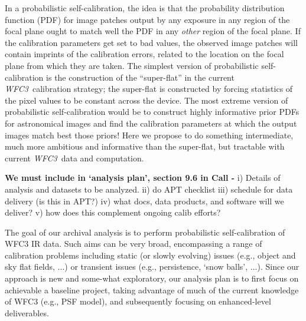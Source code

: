 \documentclass[12pt]{article}
\newcommand{\project}[1]{\textsl{#1}}
\newcommand{\WFC}{\project{WFC3}}
\begin{document}
In a probabilistic self-calibration, the idea is that the probability
distribution function (PDF) for image patches output by any exposure
in any region of the focal plane ought to match well the PDF in any
\emph{other} region of the focal plane.  If the calibration parameters
get set to bad values, the observed image patches will contain
imprints of the calibration errors, related to the location on the
focal plane from which they are taken.  The simplest version of
probabilistic self-calibration is the construction of the
``super-flat'' in the current \WFC\ calibration strategy; the
super-flat is constructed by forcing statistics of the pixel values to
be constant across the device.  The most extreme version of
probabilistic self-calibration would be to construct highly
informative prior PDFs for astronomical images and find the
calibration parameters at which the output images match best those
priors!  Here we propose to do something intermediate, much more
ambitious and informative than the super-flat, but tractable with
current \WFC\ data and computation.

%
%
\describearchival       %


\textbf{We must include in `analysis plan', section 9.6 in Call -} 
i) Details of analysis and datasets to be analyzed.  ii) do APT
checklist iii) schedule for data delivery (is this in APT?) iv) what
docs, data products, and software will we deliver? v) how does this 
complement ongoing calib efforts?

The goal of our archival analysis is to perform probabilistic
self-calibration of WFC3 IR data.  Such aims can be very broad,
encompassing a range of calibration problems including static (or slowly 
evolving) issues (e.g., object and sky flat fields, ...) or transient
issues (e.g., persistence, `snow balls', ...).  Since our approach is
new and some-what exploratory, our analysis plan is to first focus on
achievable a baseline project, taking advantage of much of the current
knowledge of WFC3 (e.g., PSF model), and subsequently focusing on
enhanced-level deliverables.
\end{document}
